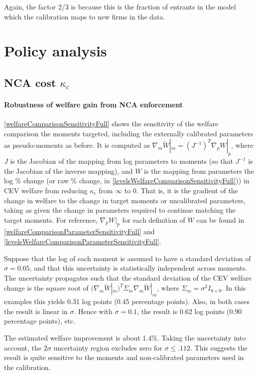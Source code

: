 \documentclass[11pt,english]{article}
\begin{document}
Again, the factor 2/3 is because this is the fraction of entrants in the model which the calibration maps to new firms in the data.

\section{Policy analysis}

\subsection{NCA cost $\kappa_c$}\label{appendix:policyanalysis:ncacost}

\paragraph{Robustness of welfare gain from NCA enforcement}

\autoref{welfareComparisonSensitivityFull} shows the sensitivity of the welfare comparison the moments targeted, including the externally calibrated parameters as pseudo-moments as before. It is computed as $\nabla_m \tilde{W}|_m = (J^{-1})^T \nabla_p W|_p$, where $J$ is the Jacobian of the mapping from log parameters to moments (so that $J^{-1}$ is the Jacobian of the inverse mapping), and $W$ is the mapping from parameters the log \% change (or raw \% change, in \autoref{levelsWelfareComparisonSensitivityFull})) in CEV welfare from reducing $\kappa_c$ from $\infty$ to $0$. That is, it is the gradient of the change in welfare to the change in target moments or uncalibrated parameters, taking as given the change in parameters required to continue matching the target moments. For reference, $\nabla_p W|_p$  for each definition of $W$ can be found in \autoref{welfareComparisonParameterSensitivityFull} and \autoref{levelsWelfareComparisonParameterSensitivityFull}.

Suppose that the log of each moment is assumed to have a standard deviation of $\sigma = 0.05$, and that this uncertainty is statistically independent across moments. The uncertainty propagates such that the standard deviation of the CEV welfare change is the square root of $(\nabla_m \tilde{W}|_m)^T \Sigma_m \nabla_m \tilde{W}|_m$, where $\Sigma_m = \sigma^2 I_{9\times 9}$. In this examples this yields 0.31 log points (0.45 percentage points). Also, in both cases the result is linear in $\sigma$. Hence with $\sigma = 0.1$, the result is 0.62 log points (0.90 percentage points), etc. 

The estimated welfare improvement is about 1.4\%. Taking the uncertainty into account, the $2\sigma$ uncertainty region excludes zero for $\sigma \le .112$. This suggests the result is quite sensitive to the moments and non-calibrated parameters used in the calibration. 
\end{document}
